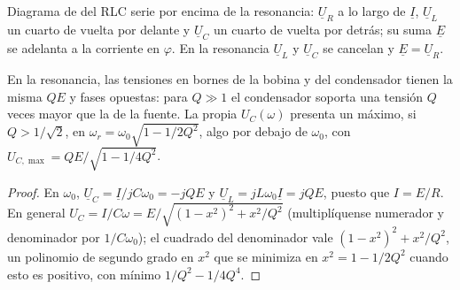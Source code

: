 \begin{omfigure}

{\small Diagrama de  del RLC serie por encima de la resonancia:
$\underline U_R$ a lo largo de $\underline I$, $\underline U_L$ un cuarto
de vuelta por delante y $\underline U_C$ un cuarto de vuelta por detrás;
su suma $\underline E$ se adelanta a la corriente en $\varphi$. En la
resonancia $\underline U_L$ y $\underline U_C$ se cancelan y
$\underline E = \underline U_R$.}
\end{omfigure}

\begin{proposition}[Sobretensión]\label{prop:b1:sinusoidal-impedance:overvoltage}
En la resonancia, las tensiones en bornes de la bobina y del condensador
tienen la misma  $QE$ y fases opuestas: para $Q \gg 1$ el
condensador soporta una tensión $Q$ veces mayor que la de la fuente. La
propia  $U_C(\omega)$ presenta un máximo, si $Q > 1/\sqrt2$, en $\omega_r =
\omega_0\sqrt{1 - 1/2Q^2}$, algo por debajo de $\omega_0$, con
$U_{C,\max} = QE/\sqrt{1 - 1/4Q^2}$.
\end{proposition}

\begin{proof}
En $\omega_0$, $\underline U_C = \underline I/jC\omega_0 = -jQE$ y
$\underline U_L = jL\omega_0\underline I = jQE$, puesto que $I = E/R$. En
general $U_C = I/C\omega = E/\sqrt{(1 - x^2)^2 + x^2/Q^2}$ (multiplíquense
numerador y denominador por $1/C\omega_0$); el cuadrado del denominador
vale $(1 - x^2)^2 + x^2/Q^2$, un polinomio de segundo grado en $x^2$ que
se minimiza en $x^2 =
1 - 1/2Q^2$ cuando esto es positivo, con mínimo $1/Q^2 - 1/4Q^4$.
\end{proof}

